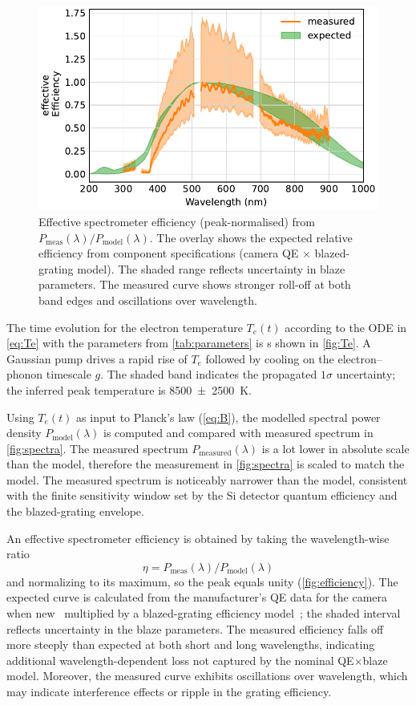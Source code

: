 \documentclass[
	parskip=half,
	a4paper,
]{scrarticle}
\begin{document}
\begin{figure}
    \centering
    \includegraphics{../analysis/figures/efficiency de.pdf}
    \caption{Effective spectrometer efficiency (peak-normalised) from \(P_{\text{meas}}(\lambda)/P_{\text{model}}(\lambda)\). The overlay shows the expected relative efficiency from component specifications (camera QE \(\times\) blazed-grating model). The shaded range reflects uncertainty in blaze parameters. The measured curve shows stronger roll-off at both band edges and oscillations over wavelength.}
    \label{fig:efficiency}
\end{figure}

The time evolution for the electron temperature \(T_e(t)\) according to the ODE in \autoref{eq:Te} with the parameters from \autoref{tab:parameters} is s shown in \autoref{fig:Te}.
A Gaussian pump drives a rapid rise of \(T_e\) followed by cooling on the electron–phonon timescale \(g\). The shaded band indicates the propagated $1\sigma$ uncertainty; the inferred peak temperature is \SI{8500(2500)}{\kelvin}.

Using \(T_e(t)\) as input to Planck’s law (\autoref{eq:B}), the modelled spectral power density \(P_\text{model}(\lambda)\) is computed and compared with measured spectrum in \autoref{fig:spectra}. 
The measured spectrum \(P_\text{measured}(\lambda)\) is a lot lower in absolute scale than the model, therefore the measurement in \autoref{fig:spectra} is scaled to match the model. The measured spectrum is noticeably narrower than the model, consistent with the finite sensitivity window set by the Si detector quantum efficiency and the blazed-grating envelope.

An effective spectrometer efficiency is obtained by taking the wavelength-wise ratio \[\eta = P_{\text{meas}}(\lambda)/P_{\text{model}}(\lambda)\] and normalizing to its maximum, so the peak equals unity (\autoref{fig:efficiency}). The expected curve is calculated from the manufacturer’s QE data for the camera when new~\cite{andor_ixonem_nodate} multiplied by a blazed-grating efficiency model~\cite{barker_ripple_1984}; the shaded interval reflects uncertainty in the blaze parameters. The measured efficiency falls off more steeply than expected at both short and long wavelengths, indicating additional wavelength-dependent loss not captured by the nominal QE\(\times\)blaze model. Moreover, the measured curve exhibits oscillations over wavelength, which may indicate interference effects or ripple in the grating efficiency.
\end{document}
